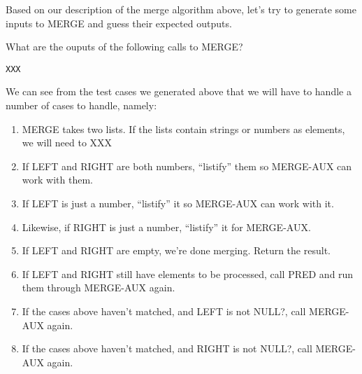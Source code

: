 \documentclass[12pt,openright,draft]{book}
\begin{document}
Based on our description of the merge algorithm above, let's try to
generate some inputs to MERGE and guess their expected outputs.

What are the ouputs of the following calls to MERGE?

\begin{verbatim}
XXX  
\end{verbatim}

We can see from the test cases we generated above that we will have to
handle a number of cases to handle, namely:

\begin{enumerate}

\item MERGE takes two lists.  If the lists contain strings or numbers
  as elements, we will need to XXX

\item If LEFT and RIGHT are both numbers, ``listify'' them so
  MERGE-AUX can work with them.

\item If LEFT is just a number, ``listify'' it so MERGE-AUX can work with
  it.

\item Likewise, if RIGHT is just a number, ``listify'' it for
  MERGE-AUX.

\item If LEFT and RIGHT are empty, we're done merging. Return the
  result.

\item If LEFT and RIGHT still have elements to be processed, call PRED
  and run them through MERGE-AUX again.

\item If the cases above haven't matched, and LEFT is not NULL?, call
  MERGE-AUX again.

\item If the cases above haven't matched, and RIGHT is not NULL?, call
  MERGE-AUX again.

\end{enumerate}
\end{document}
